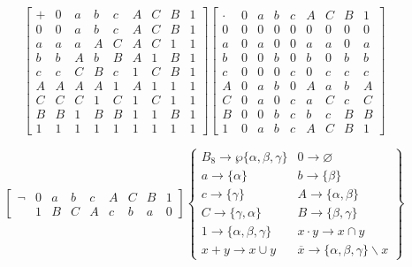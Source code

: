 \begin{enumerate}
  \[\begin{bmatrix}
   + & 0 & a & b & c & A & C & B & 1 \\
  0 & 0 & a & b & c & A & C & B & 1 \\
  a & a & a & A & C & A & C & 1 & 1 \\
  b & b & A & b & B & A & 1 & B & 1 \\
  c & c & C & B & c & 1 & C & B & 1 \\
  A & A & A & A & 1 & A & 1 & 1 & 1 \\
  C & C & C & 1 & C & 1 & C & 1 & 1 \\
  B & B & 1 & B & B & 1 & 1 & B & 1 \\
  1 & 1 & 1 & 1 & 1 & 1 & 1 & 1 & 1
  \end{bmatrix}\begin{bmatrix}
   \cdot & 0 & a & b & c & A & C & B & 1 \\
  0 & 0 & 0 & 0 & 0 & 0 & 0 & 0 & 0 \\
  a & 0 & a & 0 & 0 & a & a & 0 & a \\
  b & 0 & 0 & b & 0 & b & 0 & b & b \\
  c & 0 & 0 & 0 & c & 0 & c & c & c \\
  A & 0 & a & b & 0 & A & a & b & A \\
  C & 0 & a & 0 & c & a & C & c & C \\
  B & 0 & 0 & b & c & b & c & B & B \\
  1 & 0 & a & b & c & A & C & B & 1
  \end{bmatrix}\]

  \[\begin{bmatrix}
  \neg & 0 & a & b & c & A & C & B & 1 \\
   & 1 & B & C & A & c & b & a & 0
  \end{bmatrix}\begin{Bmatrix}
  {{B_{8}\rightarrow\wp}{\{{\alpha,\beta,\gamma}\}}} & {0\rightarrow\varnothing} \\
  {a\rightarrow{\{\alpha\}}} & {b\rightarrow{\{\beta\}}} \\
  {c\rightarrow{\{\gamma\}}} & {A\rightarrow{\{{\alpha,\beta}\}}} \\
  {C\rightarrow{\{{\gamma,\alpha}\}}} & {B\rightarrow{\{{\beta,\gamma}\}}} \\
  {1\rightarrow{\{{\alpha,\beta,\gamma}\}}} & {{x \cdot y}\rightarrow{x \cap y}} \\
  {{x + y}\rightarrow{x \cup y}} & {\overline{x}\rightarrow{{\{{\alpha,\beta,\gamma}\}} \smallsetminus x}}
  \end{Bmatrix}\]


\end{enumerate}
